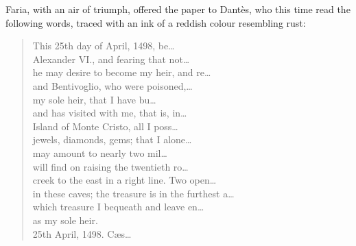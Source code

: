  Faria, with an air of triumph, offered the paper to Dantès, who this time read the following words, traced with an ink of a reddish colour resembling rust:  
\begin{letter}
\begin{quotation}\raggedright\oldfont

	This 25th day of April, 1498, be\dots \\      
	Alexander VI., and fearing that not\dots \\      
	he may desire to become my heir, and re\dots \\      
	and Bentivoglio, who were poisoned,\dots \\      
	my sole heir, that I have bu\dots \\      
	and has visited with me, that is, in\dots \\      
	Island of Monte Cristo, all I poss\dots \\      
	jewels, diamonds, gems; that I alone\dots \\      
	may amount to nearly two mil\dots \\      
	will find on raising the twentieth ro\dots \\      
	creek to the east in a right line. Two open\dots \\      
	in these caves; the treasure is in the furthest a\dots \\      
	which treasure I bequeath and leave en\dots \\      
	as my sole heir.\\      
	25th April, 1498.\hspace{2em} Cæs\dots  
 \end{quotation}

\end{letter}

